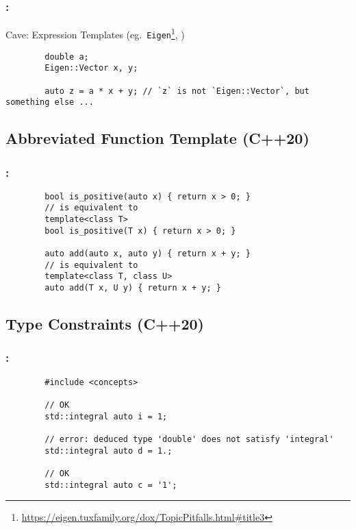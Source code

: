 \documentclass[aspectratio=43, t]{beamer}
\begin{document}
\begin{frame}[fragile]
	\frametitle{\secname: \subsecname}

	Cave: Expression Templates (eg.\ \texttt{Eigen}\footnote[1]{\url{https://eigen.tuxfamily.org/dox/TopicPitfalls.html\#title3}}, \textellipsis)
	\begin{verbatim}
		double a;
		Eigen::Vector x, y;

		auto z = a * x + y; // `z` is not `Eigen::Vector`, but something else ...
	\end{verbatim}
\end{frame}

\subsection*{Abbreviated Function Template (C++20)}
\begin{frame}[fragile]
	\frametitle{\secname: \subsecname\footnotemark[1]{}}

	\begin{verbatim}
		bool is_positive(auto x) { return x > 0; }
		// is equivalent to
		template<class T>
		bool is_positive(T x) { return x > 0; }

		auto add(auto x, auto y) { return x + y; }
		// is equivalent to
		template<class T, class U>
		auto add(T x, U y) { return x + y; }
	\end{verbatim}
\end{frame}

\subsection*{Type Constraints (C++20)}
\begin{frame}[fragile]
	\frametitle{\secname: \subsecname}

	\begin{verbatim}
		#include <concepts>

		// OK
		std::integral auto i = 1;

		// error: deduced type 'double' does not satisfy 'integral'
		std::integral auto d = 1.;

		// OK
		std::integral auto c = '1';
	\end{verbatim}
\end{frame}
\end{document}
